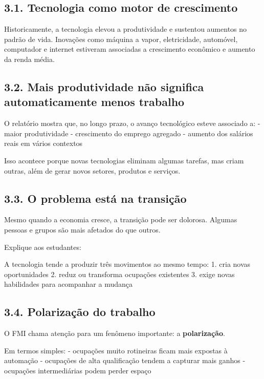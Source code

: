 \documentclass[
]{book}
\theoremstyle{definition}
\theoremstyle{definition}
\theoremstyle{definition}
\theoremstyle{definition}
\theoremstyle{remark}
\begin{document}
\subsection{3.1. Tecnologia como motor de crescimento}\label{tecnologia-como-motor-de-crescimento}

Historicamente, a tecnologia elevou a produtividade e sustentou aumentos no padrão de vida. Inovações como máquina a vapor, eletricidade, automóvel, computador e internet estiveram associadas a crescimento econômico e aumento da renda média.

\subsection{3.2. Mais produtividade não significa automaticamente menos trabalho}\label{mais-produtividade-nuxe3o-significa-automaticamente-menos-trabalho}

O relatório mostra que, no longo prazo, o avanço tecnológico esteve associado a:
- maior produtividade
- crescimento do emprego agregado
- aumento dos salários reais em vários contextos

Isso acontece porque novas tecnologias eliminam algumas tarefas, mas criam outras, além de gerar novos setores, produtos e serviços.

\subsection{3.3. O problema está na transição}\label{o-problema-estuxe1-na-transiuxe7uxe3o}

Mesmo quando a economia cresce, a transição pode ser dolorosa. Algumas pessoas e grupos são mais afetados do que outros.

Explique aos estudantes:

A tecnologia tende a produzir três movimentos ao mesmo tempo:
1. cria novas oportunidades
2. reduz ou transforma ocupações existentes
3. exige novas habilidades para acompanhar a mudança

\subsection{3.4. Polarização do trabalho}\label{polarizauxe7uxe3o-do-trabalho}

O FMI chama atenção para um fenômeno importante: a \textbf{polarização}.

Em termos simples:
- ocupações muito rotineiras ficam mais expostas à automação
- ocupações de alta qualificação tendem a capturar mais ganhos
- ocupações intermediárias podem perder espaço
\end{document}
